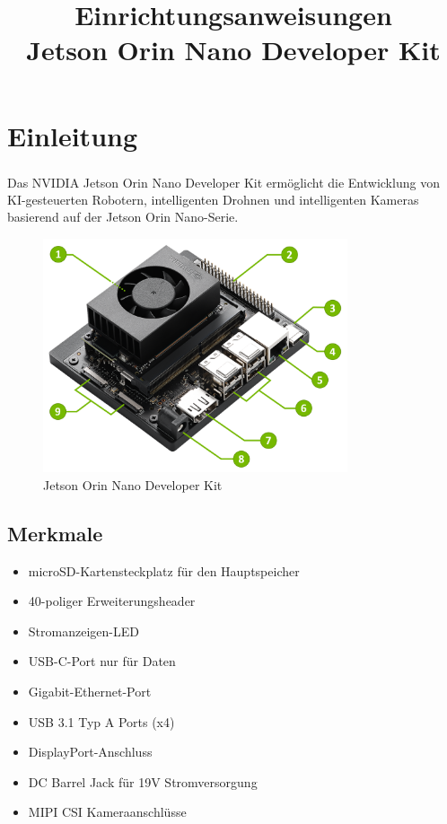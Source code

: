 \documentclass{article}
\title{Einrichtungsanweisungen \\Jetson Orin Nano Developer Kit}
\author{}
\date{}
\begin{document}
\maketitle

\section*{Einleitung}

Das NVIDIA\textsuperscript{\textregistered} Jetson Orin Nano\textsuperscript{\texttrademark} Developer Kit ermöglicht die Entwicklung von KI-gesteuerten Robotern, intelligenten Drohnen und intelligenten Kameras basierend auf der Jetson Orin Nano-Serie.

\begin{figure}[h!]
    \centering

    \includegraphics[width=0.8\textwidth]{jetsonOrinNano8GB.png} 

    \caption{Jetson Orin Nano Developer Kit}
\end{figure}

\subsection*{Merkmale}

\begin{itemize}
    \item microSD-Kartensteckplatz für den Hauptspeicher
    \item 40-poliger Erweiterungsheader
    \item Stromanzeigen-LED
    \item USB-C-Port nur für Daten
    \item Gigabit-Ethernet-Port
    \item USB 3.1 Typ A Ports (x4)
    \item DisplayPort-Anschluss
    \item DC Barrel Jack für 19V Stromversorgung
    \item MIPI CSI Kameraanschlüsse
\end{itemize}
\end{document}
